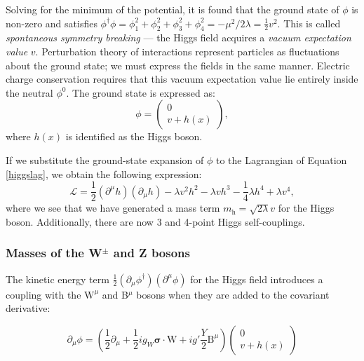 Solving for the minimum of the potential, it is found that the ground state of $\phi$ is non-zero and satisfies $\phi^{\dagger}\phi = \phi_{1}^{2} + \phi_{2}^{2} + \phi_{3}^{2}  + \phi_{4}^{2} = - \mu^{2}/{2\lambda} = \frac{1}{2}v^{2}$. This is called \textit{spontaneous symmetry breaking} --- the Higgs field acquires a \textit{vacuum expectation value} $v$. Perturbation theory of interactions represent particles as fluctuations about the ground state; we must express the fields in the same manner. Electric charge conservation requires that this vacuum expectation value lie entirely inside the neutral $\phi^{0}$. The ground state is expressed as: 
\begin{equation}
\phi = \begin{pmatrix} 0 \\  v + h(x) \end{pmatrix},
\end{equation}
where $h(x)$ is identified as the Higgs boson.

If we substitute the ground-state expansion of $\phi$ to the Lagrangian of Equation \ref{higgslag}, we obtain the following expression:
\begin{equation}
\mathcal{L} = \frac{1}{2}(\partial^{\mu}h)(\partial_{\mu}h) - \lambda v^{2} h^{2} - \lambda vh^{3} - \frac{1}{4}\lambda h^{4} + \lambda v^{4},
\end{equation}
where we see that we have generated a mass term $m_{\mathrm{h}} = \sqrt{2 \lambda} v$ for the Higgs boson. Additionally, there are now 3 and 4-point Higgs self-couplings.

\subsubsection{Masses of the W$^{\pm}$ and Z bosons}

The kinetic energy term $\frac{1}{2} (\partial_{\mu}\phi^{\dagger})(\partial^{\mu}\phi)$ for the Higgs field introduces a coupling with the $\bm{\mathrm{W}}^{\mu}$ and B$^{\mu}$ bosons when they are added to the covariant derivative:

\begin{equation}
\partial_{\mu}\phi = \left( \frac{1}{2}\partial_{\mu} + \frac{1}{2} i g_{W}\bm{\sigma}\cdot\bm{\mathrm{W}} + i g' \frac{Y}{2} \mathrm{B}^{\mu} \right) \begin{pmatrix} 0 \\ v + h(x) \end{pmatrix}
\end{equation}

